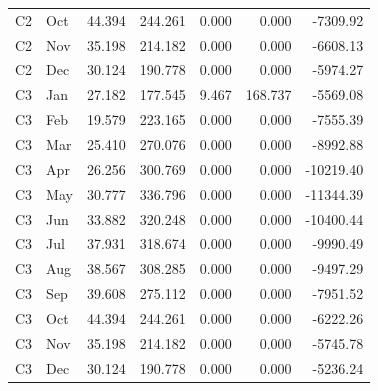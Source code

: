 \begin{longtable}{llrrrrr}
C2 & Oct & 44.394 & 244.261 & 0.000 & 0.000 & -7309.92 \\
C2 & Nov & 35.198 & 214.182 & 0.000 & 0.000 & -6608.13 \\
C2 & Dec & 30.124 & 190.778 & 0.000 & 0.000 & -5974.27 \\
C3 & Jan & 27.182 & 177.545 & 9.467 & 168.737 & -5569.08 \\
C3 & Feb & 19.579 & 223.165 & 0.000 & 0.000 & -7555.39 \\
C3 & Mar & 25.410 & 270.076 & 0.000 & 0.000 & -8992.88 \\
C3 & Apr & 26.256 & 300.769 & 0.000 & 0.000 & -10219.40 \\
C3 & May & 30.777 & 336.796 & 0.000 & 0.000 & -11344.39 \\
C3 & Jun & 33.882 & 320.248 & 0.000 & 0.000 & -10400.44 \\
C3 & Jul & 37.931 & 318.674 & 0.000 & 0.000 & -9990.49 \\
C3 & Aug & 38.567 & 308.285 & 0.000 & 0.000 & -9497.29 \\
C3 & Sep & 39.608 & 275.112 & 0.000 & 0.000 & -7951.52 \\
C3 & Oct & 44.394 & 244.261 & 0.000 & 0.000 & -6222.26 \\
C3 & Nov & 35.198 & 214.182 & 0.000 & 0.000 & -5745.78 \\
C3 & Dec & 30.124 & 190.778 & 0.000 & 0.000 & -5236.24 \\
\bottomrule
\end{longtable}
